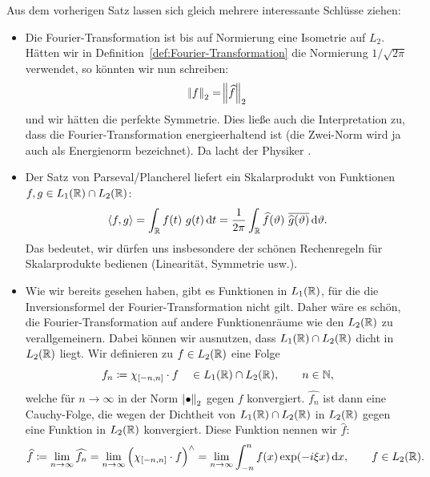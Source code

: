 \begin{remark}
Aus dem vorherigen Satz lassen sich gleich mehrere interessante Schlüsse ziehen:
\begin{itemize}
\item Die Fourier-Transformation ist bis auf Normierung eine Isometrie auf $ L_{2} $. Hätten wir in 
  Definition~\ref{def:Fourier-Transformation} die Normierung $ 1 / \sqrt{2\pi} $ verwendet, so
  könnten wir nun schreiben:
  \[
    \norm{f}_{2} = \norm{\widehat{f}}_{2}
  \]
  und wir hätten die perfekte Symmetrie. Dies ließe auch die Interpretation zu, dass die 
  Fourier-Transformation energieerhaltend ist (die Zwei-Norm wird ja auch als Energienorm 
  bezeichnet). Da lacht der Physiker \smiley.
\item Der Satz von Parseval/Plancherel liefert ein Skalarprodukt von Funktionen
  $ f, g \in L_{1}(\mathbb{R}) \cap L_{2}(\mathbb{R}) $:
  \[
      \langle f, g \rangle 
    = \int_{\R} f(t) \ g(t) \dif t
    = \frac{1}{2\pi} \int_{\R} \widehat{f}(\vartheta) \ \overline{\widehat{g}(\vartheta)}
          \dif \vartheta.
  \]
  Das bedeutet, wir dürfen uns insbesondere der schönen Rechenregeln für Skalarprodukte bedienen
  (Linearität, Symmetrie usw.).
\item Wie wir bereits gesehen haben, gibt es Funktionen in $ L_{1}(\mathbb{R}) $, für die die 
  Inversionsformel der Fourier-Transformation nicht gilt. Daher wäre es schön, die
  Fourier-Transformation auf andere Funktionenräume wie den $ L_{2}(\mathbb{R}) $ zu verallgemeinern. Dabei
  können wir ausnutzen, dass $ L_{1}(\mathbb{R}) \cap L_{2}(\mathbb{R}) $ dicht in $ L_{2}(\mathbb{R}) $ liegt. Wir
  definieren zu $ f \in L_{2}(\mathbb{R}) $ eine Folge
  \[
    f_{n} \coloneqq \chi_{[-n,n]} \cdot f \quad \in L_{1}(\mathbb{R}) \cap L_{2}(\mathbb{R}), \qquad n \in \mathbb{N},
  \]
  welche für $ n \to \infty $ in der Norm $ \norm{\bullet}_{2} $ gegen $ f $ konvergiert.
  $ \widehat{f_{n}} $ ist dann eine Cauchy-Folge, die wegen der Dichtheit von $ L_{1}(\mathbb{R}) \cap 
  L_{2}(\mathbb{R}) $ in $ L_{2}(\mathbb{R}) $ gegen eine Funktion in $ L_{2}(\mathbb{R}) $ konvergiert. Diese Funktion 
  nennen wir $ \widehat{f} $:
  \[
      \widehat{f} \coloneqq \lim\limits_{n \to \infty} \widehat{f_{n}}
    = \lim\limits_{n \to \infty} \left( \chi_{[-n,n]} \cdot f \right)^{\wedge}
    = \lim\limits_{n \to \infty} \int_{-n}^{n} f(x) \exp(-i\xi x) \dif x,
      \qquad f \in L_{2}(\R).
  \]
  
\end{itemize}
\end{remark}


